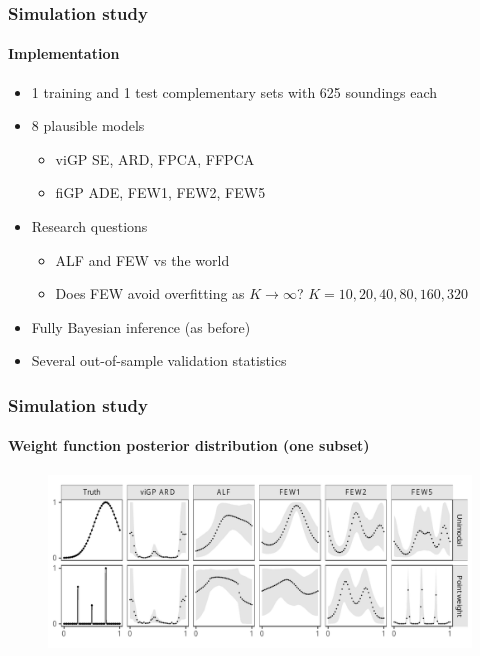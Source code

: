 \documentclass[handout]{snedecorbeamer}
\begin{document}
\begin{frame}
  \frametitle{Simulation study}
  \framesubtitle{Implementation}

  \begin{itemize}
  \item 1 training and 1 test complementary sets with 625 soundings each
  \item 8 plausible models
    \begin{itemize}
    \item viGP SE, ARD, FPCA, FFPCA
    \item fiGP ADE, FEW1, FEW2, FEW5
    \end{itemize}
  \item Research questions
    \begin{itemize}
    \item ALF and FEW vs the world
    \item Does FEW avoid overfitting as $K\to\infty$?
      $K = 10, 20, 40, 80, 160, 320$
    \end{itemize}
  \item Fully Bayesian inference (as before)
  \item Several out-of-sample validation statistics
    \hyperlink{frm:validation}{}
  \end{itemize}
\end{frame}

\begin{frame}[c]
  \frametitle{Simulation study}
  \framesubtitle{Weight function posterior distribution (one subset)}

  \begin{figure}
    \centering
    \includegraphics[width=\textwidth]{syn01-weight-fitted-mini2}
  \end{figure}
\end{frame}
\end{document}
